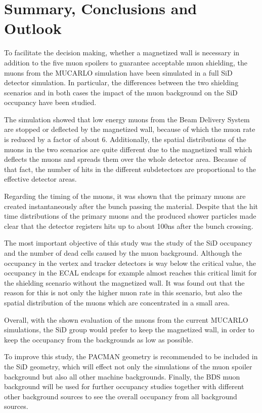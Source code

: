 \section{Summary, Conclusions and Outlook}

To facilitate the decision making, whether a magnetized wall is necessary in addition to the five muon spoilers to guarantee acceptable muon shielding, the muons from the MUCARLO simulation have been simulated in a full SiD detector simulation.
In particular, the differences between the two shielding scenarios and in both cases the impact of the muon background on the SiD occupancy have been studied.

The simulation showed that low energy muons from the Beam Delivery System are stopped or deflected by the magnetized wall, because of which the muon rate is reduced by a factor of about 6.
Additionally, the spatial distributions of the muons in the two scenarios are quite different due to the magnetized wall which deflects the muons and spreads them over the whole detector area.
Because of that fact, the number of hits in the different subdetectors are proportional to the effective detector areas.

Regarding the timing of the muons, it was shown that the primary muons are created instantaneously after the bunch passing the material.
Despite that the hit time distributions of the primary muons and the produced shower particles made clear that the detector registers hits up to about \unit{100}{ns} after the bunch crossing.

The most important objective of this study was the study of the SiD occupancy and the number of dead cells caused by the muon background.
Although the occupancy in the vertex and tracker detectors is way below the critical value, the occupancy in the ECAL endcaps for example almost reaches this critical limit for the shielding scenario without the magnetized wall.
It was found out that the reason for this is not only the higher muon rate in this scenario, but also the spatial distribution of the muons which are concentrated in a small area.

Overall, with the shown evaluation of the muons from the current MUCARLO simulations, the SiD group would prefer to keep the magnetized wall, in order to keep the occupancy from the backgrounds as low as possible.

To improve this study, the PACMAN geometry is recommended to be included in the SiD geometry, which will effect not only the simulations of the muon spoiler background but also all other machine backgrounds.
Finally, the BDS muon background will be used for further occupancy studies together with different other background sources to see the overall occupancy from all background sources.

